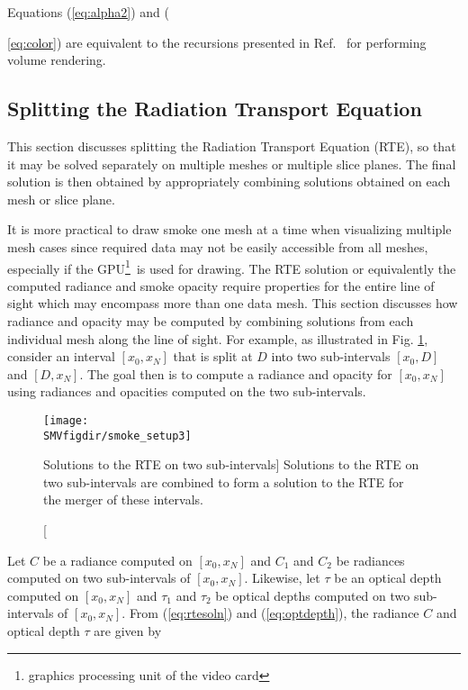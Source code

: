 Equations (\ref{eq:alpha2}) and ({\ref{eq:color}) are equivalent
to the recursions presented in Ref.~\cite[Chapter 39]{gpugems} for
performing volume rendering.


\subsection{Splitting the Radiation Transport Equation}
This section discusses splitting the Radiation Transport
Equation (RTE), so that it may be solved separately on multiple
meshes or multiple slice planes.  The final solution is then
obtained by  appropriately combining solutions obtained on each
mesh or slice plane.

It is more practical to draw smoke one mesh at a time when
visualizing multiple mesh cases since required data may not be
easily accessible from all meshes, especially if the
GPU\footnote{graphics processing unit of the video card}\ is used
for drawing.  The RTE solution or equivalently the computed
radiance and smoke opacity require  properties for the entire line
of sight which may encompass more than one data mesh.  This
section discusses how  radiance and opacity may be computed by
combining solutions from each individual mesh along the line of
sight.  For example, as illustrated in Fig. \ref{figsmokesetup3},
consider an interval $[x_0,x_N]$ that is split at $D$ into two
sub-intervals $[x_0,D]$ and $[D,x_N]$.  The goal then is to
compute a radiance and opacity for $[x_0,x_N]$ using radiances and
opacities computed on  the two sub-intervals.

\begin{figure}[bph]
\begin{center}
\texttt{[image: \\SMVfigdir/smoke\_setup3]}
\end{center}
\caption
[Solutions to the RTE on two sub-intervals]
{Solutions to the RTE on two sub-intervals are combined
to form a solution to the RTE for the merger of these intervals.}
\label{figsmokesetup3}
\end{figure}

Let $C$ be a radiance computed on $[x_0,x_N]$ and $C_1$ and $C_2$
be radiances computed on two sub-intervals of $[x_0,x_N]$.
Likewise, let $\tau$ be an optical depth computed on $[x_0,x_N]$
and $\tau_1$ and $\tau_2$ be optical depths computed on two
sub-intervals of $[x_0,x_N]$. From (\ref{eq:rtesoln}) and
(\ref{eq:optdepth}), the radiance $C$ and optical depth $\tau$ are
given by

}
